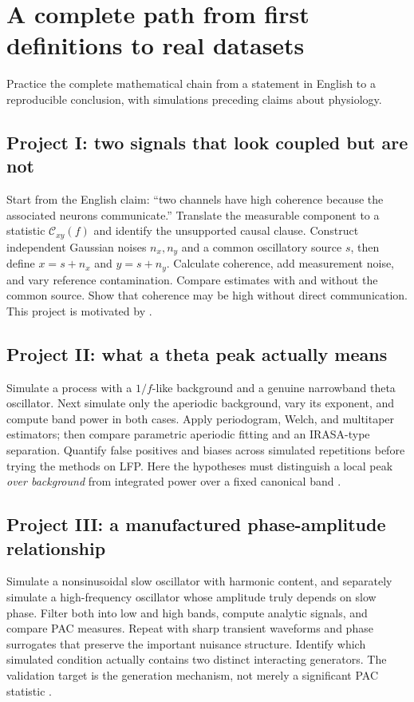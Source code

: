 \chapter{A complete path from first definitions to real datasets}\label{ch:roadmap}
\begin{readergoal}Practice the complete mathematical chain from a statement in English to a reproducible conclusion, with simulations preceding claims about physiology.\end{readergoal}
\section{Project I: two signals that look coupled but are not}
Start from the English claim: ``two channels have high coherence because the associated neurons communicate.'' Translate the measurable component to a statistic $\mathcal C_{xy}(f)$ and identify the unsupported causal clause. Construct independent Gaussian noises $n_x,n_y$ and a common oscillatory source $s$, then define $x=s+n_x$ and $y=s+n_y$. Calculate coherence, add measurement noise, and vary reference contamination. Compare estimates with and without the common source. Show that coherence may be high without direct communication. This project is motivated by \cite{Bastos2016,CohenTsuchiya2018}.

\section{Project II: what a theta peak actually means}
Simulate a process with a $1/f$-like background and a genuine narrowband theta oscillator. Next simulate only the aperiodic background, vary its exponent, and compute band power in both cases. Apply periodogram, Welch, and multitaper estimators; then compare parametric aperiodic fitting and an IRASA-type separation. Quantify false positives and biases across simulated repetitions before trying the methods on LFP. Here the hypotheses must distinguish a local peak \emph{over background} from integrated power over a fixed canonical band \cite{Donoghue2020,Gerster2022}.

\section{Project III: a manufactured phase-amplitude relationship}
Simulate a nonsinusoidal slow oscillator with harmonic content, and separately simulate a high-frequency oscillator whose amplitude truly depends on slow phase. Filter both into low and high bands, compute analytic signals, and compare PAC measures. Repeat with sharp transient waveforms and phase surrogates that preserve the important nuisance structure. Identify which simulated condition actually contains two distinct interacting generators. The validation target is the generation mechanism, not merely a significant PAC statistic \cite{Aru2015,ColeVoytek2018}.

